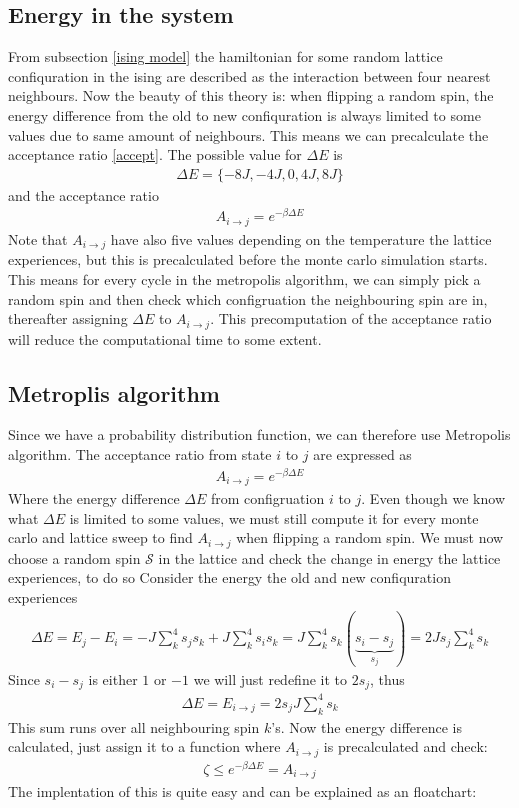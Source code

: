 \documentclass[a4paper, 10pt]{article}
\begin{document}
\subsection{Energy in the system} From subsection \eqref{ising model} the hamiltonian for some random lattice confiquration in the ising
are described as the interaction between four nearest neighbours. Now the beauty of this theory is:
 when flipping a random spin, the energy difference from the old to new confiquration is always limited to some values
due to same amount of neighbours. This means we can precalculate the acceptance ratio
\eqref{accept}. The possible value for $\Delta E$ is
\begin{align}
  \Delta E = \{-8J, -4J, 0, 4J, 8J\}
\end{align}
and the acceptance ratio
\begin{align}
  A_{i \to j} = e^{-\beta \Delta E}
\end{align}
Note that $A_{i \to j}$ have also five values depending on the temperature the lattice experiences, but this
is precalculated before the monte carlo simulation starts. This means for every cycle in the metropolis algorithm, we can simply pick a random
spin and then check which configruation the neighbouring spin are in, thereafter assigning $\Delta E$
to $A_{i \to j}$. This precomputation of the acceptance ratio will reduce the computational time to some extent.
\subsection{Metroplis algorithm \label{metro meth}} Since we have a probability distribution function, we can therefore use Metropolis algorithm. The acceptance ratio
from state $i$ to $j$ are expressed as
\begin{align}
  A_{i \to j} = e^{-\beta\Delta E}
\end{align}
Where the energy difference $\Delta E$ from configruation $i$ to $j$. Even though we know what $\Delta E$ is limited
to some values, we must still compute it for every monte carlo and lattice sweep to find $A_{i \to j}$ when flipping a random spin.
We must now choose a random spin $\mathcal{S}$ in the lattice and check the change in energy the lattice experiences, to do so
Consider the energy the old and new confiquration experiences
\begin{align}
  \Delta E = E_{j} - E_{i} = -J\sum_{k}^{4}s_{j}s_{k} + J\sum_{k}^{4}s_{i}s_{k} = J\sum_{k}^{4}s_{k}(\underbrace{s_{i} - s_{j}}_{s_{j}}) = 2Js_{j}\sum_{k}^{4}s_{k}
\end{align}
Since $s_{i}-s_{j}$ is either $1$ or $-1$ we will just redefine it to $2s_{j}$, thus
\begin{align}
    \Delta E = E_{i \to j} = 2s_{j}J\sum_{k}^{4}s_{k}
\end{align}
This sum runs over all neighbouring spin $k$'s. Now the energy difference is calculated,
just assign it to a function where $A_{i\to j}$ is precalculated and check:
\begin{align}
  \zeta \le e^{-\beta \Delta E} = A_{i \to j}
\end{align}
The implentation of this is quite easy and can be explained as an floatchart:
\end{document}
